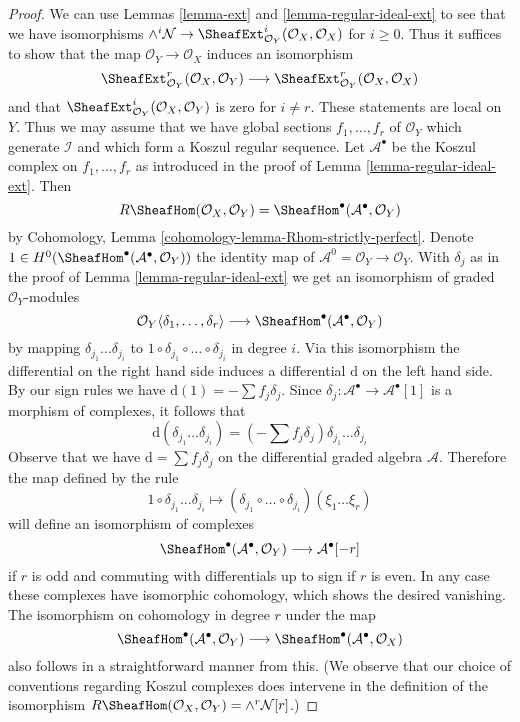 \begin{proof}
We can use Lemmas \ref{lemma-ext} and \ref{lemma-regular-ideal-ext}
to see that we have isomorphisms
$\wedge^i\mathcal{N} \to
\SheafExt^i_{\mathcal{O}_Y}(\mathcal{O}_X, \mathcal{O}_X)$
for $i \geq 0$. Thus it suffices to show that the map
$\mathcal{O}_Y \to \mathcal{O}_X$ induces an isomorphism
$$
\SheafExt^r_{\mathcal{O}_Y}(\mathcal{O}_X, \mathcal{O}_Y)
\longrightarrow
\SheafExt^r_{\mathcal{O}_Y}(\mathcal{O}_X, \mathcal{O}_X)
$$
and that
$\SheafExt^i_{\mathcal{O}_Y}(\mathcal{O}_X, \mathcal{O}_Y)$
is zero for $i \not = r$. These statements are local on $Y$. Thus
we may assume that we have global sections $f_1, \ldots, f_r$ of
$\mathcal{O}_Y$ which generate $\mathcal{I}$ and which form a
Koszul regular sequence. Let $\mathcal{A}^\bullet$
be the Koszul complex on $f_1, \ldots, f_r$ as introduced in the proof of
Lemma \ref{lemma-regular-ideal-ext}. Then
$$
R\SheafHom(\mathcal{O}_X, \mathcal{O}_Y) =
\SheafHom^\bullet(\mathcal{A}^\bullet, \mathcal{O}_Y)
$$
by Cohomology, Lemma \ref{cohomology-lemma-Rhom-strictly-perfect}.
Denote $1 \in H^0(\SheafHom^\bullet(\mathcal{A}^\bullet, \mathcal{O}_Y))$
the identity map of $\mathcal{A}^0 = \mathcal{O}_Y \to \mathcal{O}_Y$.
With $\delta_j$ as in the proof of Lemma \ref{lemma-regular-ideal-ext}
we get an isomorphism of graded $\mathcal{O}_Y$-modules
$$
\mathcal{O}_Y\langle \delta_1, \ldots, \delta_r\rangle
\longrightarrow
\SheafHom^\bullet(\mathcal{A}^\bullet, \mathcal{O}_Y)
$$
by mapping $\delta_{j_1} \ldots \delta_{j_i}$ to
$1 \circ \delta_{j_1} \circ \ldots \circ \delta_{j_i}$ in degree $i$.
Via this isomorphism the differential on the right hand side
induces a differential $\text{d}$ on the left hand side.
By our sign rules we have $\text{d}(1) = - \sum f_j \delta_j$.
Since $\delta_j : \mathcal{A}^\bullet \to \mathcal{A}^\bullet[1]$
is a morphism of complexes, it follows that
$$
\text{d}(\delta_{j_1} \ldots \delta_{j_i}) =
(- \sum f_j \delta_j )\delta_{j_1} \ldots \delta_{j_i}
$$
Observe that we have $\text{d} = \sum f_j \delta_j$ on the differential
graded algebra $\mathcal{A}$. Therefore the map defined by the rule
$$
1 \circ \delta_{j_1} \ldots \delta_{j_i} \longmapsto
(\delta_{j_1} \circ \ldots \circ \delta_{j_i})(\xi_1 \ldots \xi_r)
$$
will define an isomorphism of complexes
$$
\SheafHom^\bullet(\mathcal{A}^\bullet, \mathcal{O}_Y)
\longrightarrow \mathcal{A}^\bullet[-r]
$$
if $r$ is odd and commuting with differentials up to sign if $r$ is even.
In any case these complexes have isomorphic cohomology, which shows the
desired vanishing. The isomorphism on cohomology in degree $r$
under the map
$$
\SheafHom^\bullet(\mathcal{A}^\bullet, \mathcal{O}_Y)
\longrightarrow
\SheafHom^\bullet(\mathcal{A}^\bullet, \mathcal{O}_X)
$$
also follows in a straightforward manner from this.
(We observe that our choice of conventions regarding
Koszul complexes does intervene in the definition
of the isomorphism
$R\SheafHom(\mathcal{O}_X, \mathcal{O}_Y) = \wedge^r \mathcal{N}[r]$.)
\end{proof}

